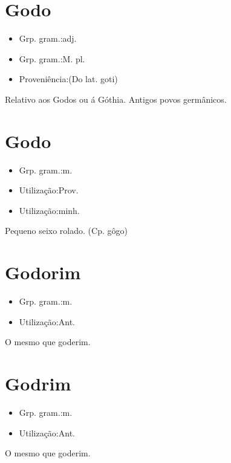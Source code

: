 \section{Godo}
\begin{itemize}
\item {Grp. gram.:adj.}
\end{itemize}
\begin{itemize}
\item {Grp. gram.:M. pl.}
\end{itemize}
\begin{itemize}
\item {Proveniência:(Do lat. \textunderscore goti\textunderscore )}
\end{itemize}
Relativo aos Godos ou á Góthia.
Antigos povos germânicos.
\section{Godo}
\begin{itemize}
\item {Grp. gram.:m.}
\end{itemize}
\begin{itemize}
\item {Utilização:Prov.}
\end{itemize}
\begin{itemize}
\item {Utilização:minh.}
\end{itemize}
Pequeno seixo rolado.
(Cp. \textunderscore gôgo\textunderscore )
\section{Godorim}
\begin{itemize}
\item {Grp. gram.:m.}
\end{itemize}
\begin{itemize}
\item {Utilização:Ant.}
\end{itemize}
O mesmo que \textunderscore goderim\textunderscore .
\section{Godrim}
\begin{itemize}
\item {Grp. gram.:m.}
\end{itemize}
\begin{itemize}
\item {Utilização:Ant.}
\end{itemize}
O mesmo que \textunderscore goderim\textunderscore .
